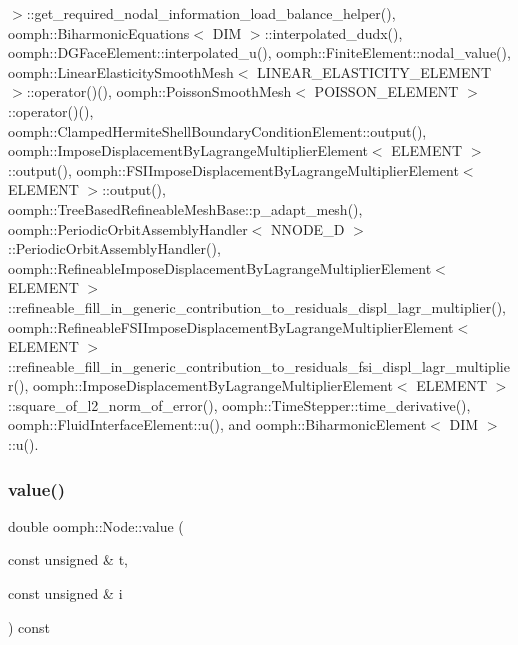 $>$\+::get\+\_\+required\+\_\+nodal\+\_\+information\+\_\+load\+\_\+balance\+\_\+helper(), oomph\+::\+Biharmonic\+Equations$<$ D\+I\+M $>$\+::interpolated\+\_\+dudx(), oomph\+::\+D\+G\+Face\+Element\+::interpolated\+\_\+u(), oomph\+::\+Finite\+Element\+::nodal\+\_\+value(), oomph\+::\+Linear\+Elasticity\+Smooth\+Mesh$<$ L\+I\+N\+E\+A\+R\+\_\+\+E\+L\+A\+S\+T\+I\+C\+I\+T\+Y\+\_\+\+E\+L\+E\+M\+E\+N\+T $>$\+::operator()(), oomph\+::\+Poisson\+Smooth\+Mesh$<$ P\+O\+I\+S\+S\+O\+N\+\_\+\+E\+L\+E\+M\+E\+N\+T $>$\+::operator()(), oomph\+::\+Clamped\+Hermite\+Shell\+Boundary\+Condition\+Element\+::output(), oomph\+::\+Impose\+Displacement\+By\+Lagrange\+Multiplier\+Element$<$ E\+L\+E\+M\+E\+N\+T $>$\+::output(), oomph\+::\+F\+S\+I\+Impose\+Displacement\+By\+Lagrange\+Multiplier\+Element$<$ E\+L\+E\+M\+E\+N\+T $>$\+::output(), oomph\+::\+Tree\+Based\+Refineable\+Mesh\+Base\+::p\+\_\+adapt\+\_\+mesh(), oomph\+::\+Periodic\+Orbit\+Assembly\+Handler$<$ N\+N\+O\+D\+E\+\_\+D $>$\+::\+Periodic\+Orbit\+Assembly\+Handler(), oomph\+::\+Refineable\+Impose\+Displacement\+By\+Lagrange\+Multiplier\+Element$<$ E\+L\+E\+M\+E\+N\+T $>$\+::refineable\+\_\+fill\+\_\+in\+\_\+generic\+\_\+contribution\+\_\+to\+\_\+residuals\+\_\+displ\+\_\+lagr\+\_\+multiplier(), oomph\+::\+Refineable\+F\+S\+I\+Impose\+Displacement\+By\+Lagrange\+Multiplier\+Element$<$ E\+L\+E\+M\+E\+N\+T $>$\+::refineable\+\_\+fill\+\_\+in\+\_\+generic\+\_\+contribution\+\_\+to\+\_\+residuals\+\_\+fsi\+\_\+displ\+\_\+lagr\+\_\+multiplier(), oomph\+::\+Impose\+Displacement\+By\+Lagrange\+Multiplier\+Element$<$ E\+L\+E\+M\+E\+N\+T $>$\+::square\+\_\+of\+\_\+l2\+\_\+norm\+\_\+of\+\_\+error(), oomph\+::\+Time\+Stepper\+::time\+\_\+derivative(), oomph\+::\+Fluid\+Interface\+Element\+::u(), and oomph\+::\+Biharmonic\+Element$<$ D\+I\+M $>$\+::u().

\mbox{\label{classoomph_1_1Node_a9865f3f77710b04934c1ca07510453b8}} 
\subsubsection{\texorpdfstring{value()}{value()}\hspace{0.1cm}{\footnotesize\ttfamily [2/5]}}
{\footnotesize\ttfamily double oomph\+::\+Node\+::value (\begin{DoxyParamCaption}\item[{const unsigned \&}]{t,  }\item[{const unsigned \&}]{i }\end{DoxyParamCaption}) const}



